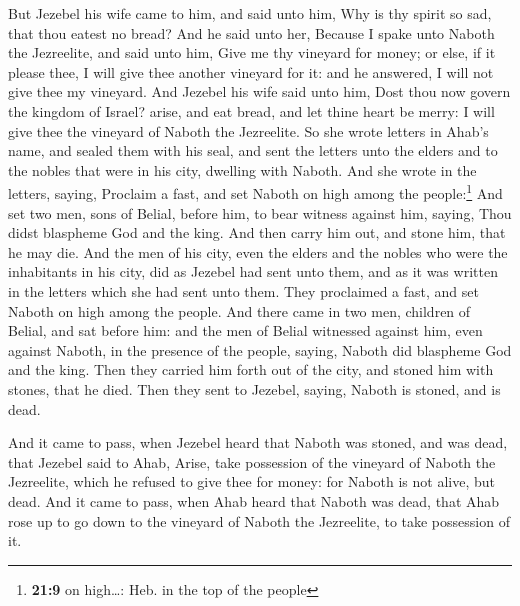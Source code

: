 But Jezebel his wife came to him, and said unto him, Why
is thy spirit so sad, that thou eatest no bread?  And he
said unto her, Because I spake unto Naboth the Jezreelite, and said unto
him, Give me thy vineyard for money; or else, if it please thee, I will
give thee another vineyard for it: and he answered, I will not give thee
my vineyard.  And Jezebel his wife said unto him, Dost
thou now govern the kingdom of Israel? arise, and eat bread, and let
thine heart be merry: I will give thee the vineyard of Naboth the
Jezreelite.  So she wrote letters in Ahab's name, and
sealed them with his seal, and sent the letters unto the elders and to
the nobles that were in his city, dwelling with Naboth. 
And she wrote in the letters, saying, Proclaim a fast, and set Naboth on
high among the people:\footnote{\textbf{21:9} on high\ldots: Heb. in the
  top of the people}  And set two men, sons of Belial,
before him, to bear witness against him, saying, Thou didst blaspheme
God and the king. And then carry him out, and stone him, that he may
die.  And the men of his city, even the elders and the
nobles who were the inhabitants in his city, did as Jezebel had sent
unto them, and as it was written in the letters which she had sent unto
them.  They proclaimed a fast, and set Naboth on high
among the people.  And there came in two men, children of
Belial, and sat before him: and the men of Belial witnessed against him,
even against Naboth, in the presence of the people, saying, Naboth did
blaspheme God and the king. Then they carried him forth out of the city,
and stoned him with stones, that he died.  Then they sent
to Jezebel, saying, Naboth is stoned, and is dead.

 And it came to pass, when Jezebel heard that Naboth was
stoned, and was dead, that Jezebel said to Ahab, Arise, take possession
of the vineyard of Naboth the Jezreelite, which he refused to give thee
for money: for Naboth is not alive, but dead.  And it
came to pass, when Ahab heard that Naboth was dead, that Ahab rose up to
go down to the vineyard of Naboth the Jezreelite, to take possession of
it.

